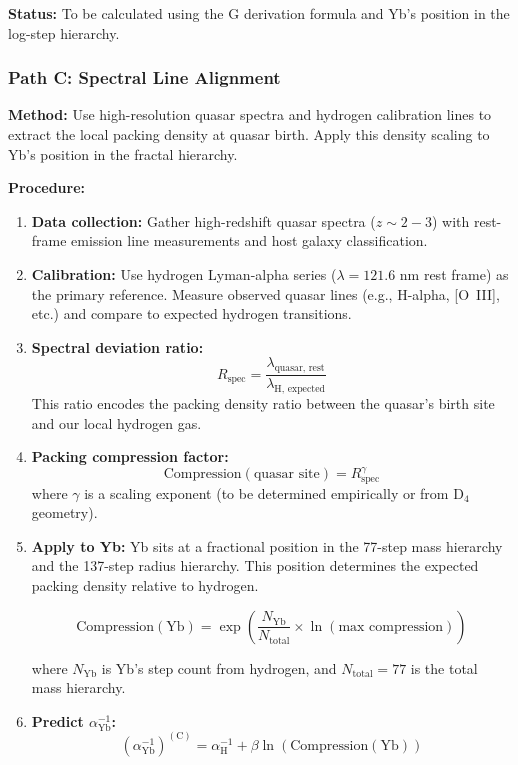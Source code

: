 \documentclass[11pt,a4paper]{article}
\begin{document}
  \noindent\textbf{Status:} To be calculated using the G derivation formula and Yb's position in the log-step hierarchy.

  \subsubsection{Path C: Spectral Line Alignment}

  \noindent\textbf{Method:} Use high-resolution quasar spectra and hydrogen calibration lines to extract the local packing density at quasar birth. Apply this density scaling to Yb's position in the fractal hierarchy.

  \noindent\textbf{Procedure:}

  \begin{enumerate}

  \item \textbf{Data collection:}
     Gather high-redshift quasar spectra ($z \sim 2{-}3$) with rest-frame emission line measurements
     and host galaxy classification.

  \item \textbf{Calibration:}
     Use hydrogen Lyman-alpha series ($\lambda = 121.6$ nm rest frame) as the primary reference.
     Measure observed quasar lines (e.g., H-alpha, [O~III], etc.) and compare to expected hydrogen transitions.

  \item \textbf{Spectral deviation ratio:}
     \[
     R_{\text{spec}} = \frac{\lambda_{\text{quasar, rest}}}{\lambda_{\text{H, expected}}}
     \]
     This ratio encodes the packing density ratio between the quasar's birth site and our local hydrogen gas.

  \item \textbf{Packing compression factor:}
     \[
     \text{Compression}(\text{quasar site}) = R_{\text{spec}}^{\gamma}
     \]
     where $\gamma$ is a scaling exponent (to be determined empirically or from D$_4$ geometry).

  \item \textbf{Apply to Yb:}
     Yb sits at a fractional position in the 77-step mass hierarchy and the 137-step radius hierarchy.
     This position determines the expected packing density relative to hydrogen.
     
     \[
     \text{Compression}(\mathrm{Yb}) = \exp\left(\frac{N_{\mathrm{Yb}}}{N_{\mathrm{total}}} \times \ln(\text{max compression})\right)
     \]
     
     where $N_{\mathrm{Yb}}$ is Yb's step count from hydrogen, and $N_{\mathrm{total}} = 77$ is the total mass hierarchy.

  \item \textbf{Predict $\alpha^{-1}_{\mathrm{Yb}}$:}
    \[
    \left(\alpha^{-1}_{\mathrm{Yb}}\right)^{(\mathrm{C})} = \alpha^{-1}_{\mathrm{H}} + \beta \ln(\text{Compression}(\mathrm{Yb}))
    \]

  \end{enumerate}
  
\end{document}
